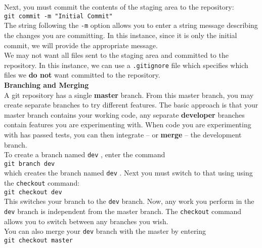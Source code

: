 \documentclass[12pt]{article}
\begin{document}
\noindent
Next, you must commit the contents of the staging area to the repository: \\

{\tt git commit -m "Initial Commit"} \\

\noindent
The string following the {\tt -m} option allows you to enter a string message describing the changes you are committing. In this instance, since it is only the initial commit, we will provide the appropriate message. \\

\noindent
We may not want all files sent to the staging area and committed to the repository. In this instance, we can use a {\tt .gitignore} file which specifies which files we {\bf do not} want committed to the repository. \\

\noindent
{\bf Branching and Merging} \\

\noindent
A git repository has a single {\bf master} branch. From this master branch, you may create separate branches to try different features. The basic approach is that your master branch contains your working code, any separate {\bf developer} branches contain features you are experimenting with. When code you are experimenting with has passed tests, you can then integrate -- or {\bf merge} -- the development branch. \\

\noindent
To create a branch named {\tt dev} , enter the command \\

{\tt git branch dev} \\

\noindent 
which creates the branch named {\tt dev} . Next you must switch to that using using the {\tt checkout}
command: \\

{\tt git checkout dev} \\

\noindent
This switches your branch to the {\tt dev} branch. Now, any work you perform in the {\tt dev} branch is independent from the master branch. The {\tt checkout} command allows you to switch between any branches you wish. \\

\noindent
You can also merge your {\tt dev} branch with the master by entering \\

{\tt git checkout master} 
\end{document}
